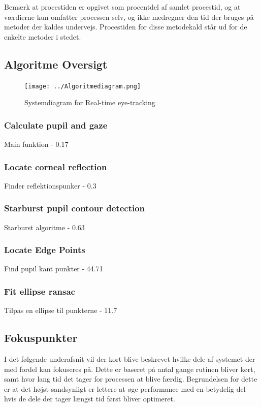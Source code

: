 \documentclass[rapport.tex]{subfiles}
\begin{document}
	
	
	Bemærk at procestiden er opgivet som procentdel af samlet procestid, og at værdierne kun omfatter processen selv, og ikke medregner den tid der bruges på metoder der kaldes undervejs. Procestiden for disse metodekald står ud for de enkelte metoder i stedet.
	
	\subsection{Algoritme Oversigt}
	\begin{figure}[h]
		\centering
		\texttt{[image: ../Algoritmediagram.png]}
		\caption[Systemdiagram]{Systemdiagram for Real-time eye-tracking}
		\label{fig:Systemdiagram}
	\end{figure}
	
	\subsubsection{Calculate pupil and gaze}
	
	Main funktion - 0.17%
	
	\subsubsection{Locate corneal reflection}
	
	Finder reflektionspunker - 0.3%
	
	\subsubsection{Starburst pupil contour detection}
	
	Starburst algoritme - 0.63%
	
	\subsubsection{Locate Edge Points}
	
	Find pupil kant punkter - 44.71%
	
	\subsubsection{Fit ellipse ransac}
	
	Tilpas en ellipse til punkterne - 11.7%
	
	\subsection{Fokuspunkter}
	I det følgende underafsnit vil der kort blive beskrevet hvilke dele af systemet der med fordel kan fokuseres på. Dette er baseret på antal gange rutinen bliver kørt, samt hvor lang tid det tager for processen at blive færdig. Begrundelsen for dette er at det højst sandsynligt er lettere at øge performance med en betydelig del hvis de dele der tager længst tid først bliver optimeret.
	
\end{document}
